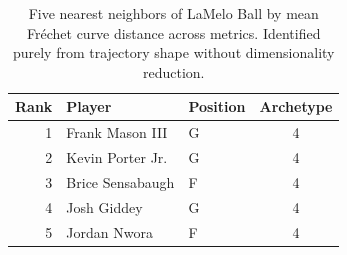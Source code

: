 \begin{table}[htbp]
  \centering\small
  \begin{tabular}{rllc}
    \toprule
    Rank & Player & Position & Archetype \\
    \midrule
    1 & Frank Mason III & G & 4 \\
    2 & Kevin Porter Jr. & G & 4 \\
    3 & Brice Sensabaugh & F & 4 \\
    4 & Josh Giddey & G & 4 \\
    5 & Jordan Nwora & F & 4 \\
    \bottomrule
  \end{tabular}
  \caption{Five nearest neighbors of LaMelo Ball by mean Fr\'{e}chet curve distance across metrics. Identified purely from trajectory shape without dimensionality reduction.}
  \label{tab:LaMelo_Ball_frechet_curve_neighbors}
\end{table}

